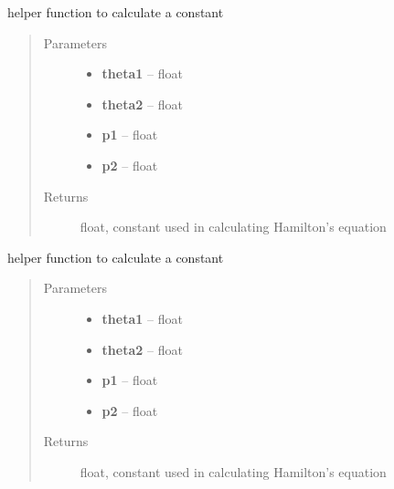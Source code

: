 \documentclass[letterpaper,10pt,english]{sphinxmanual}
\begin{document}
\begin{fulllineitems}
\label{index:doublePendulum.C1}
helper function to calculate a constant 
\begin{quote}\begin{description}
\item[{Parameters}] \leavevmode\begin{itemize}
\item {} 
\textbf{theta1} -- float

\item {} 
\textbf{theta2} -- float

\item {} 
\textbf{p1} -- float

\item {} 
\textbf{p2} -- float

\end{itemize}

\item[{Returns}] \leavevmode
float, constant used in calculating Hamilton's equation

\end{description}\end{quote}

\end{fulllineitems}


\begin{fulllineitems}
\label{index:doublePendulum.C2}
helper function to calculate a constant 
\begin{quote}\begin{description}
\item[{Parameters}] \leavevmode\begin{itemize}
\item {} 
\textbf{theta1} -- float

\item {} 
\textbf{theta2} -- float

\item {} 
\textbf{p1} -- float

\item {} 
\textbf{p2} -- float

\end{itemize}

\item[{Returns}] \leavevmode
float, constant used in calculating Hamilton's equation

\end{description}\end{quote}

\end{fulllineitems}
\end{document}
